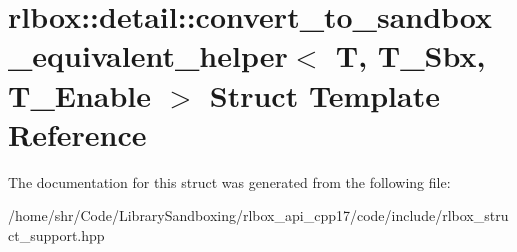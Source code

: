\hypertarget{structrlbox_1_1detail_1_1convert__to__sandbox__equivalent__helper}{}\section{rlbox\+:\+:detail\+:\+:convert\+\_\+to\+\_\+sandbox\+\_\+equivalent\+\_\+helper$<$ T, T\+\_\+\+Sbx, T\+\_\+\+Enable $>$ Struct Template Reference}
\label{structrlbox_1_1detail_1_1convert__to__sandbox__equivalent__helper}


The documentation for this struct was generated from the following file\+:\begin{DoxyCompactItemize}
\item 
/home/shr/\+Code/\+Library\+Sandboxing/rlbox\+\_\+api\+\_\+cpp17/code/include/rlbox\+\_\+struct\+\_\+support.\+hpp\end{DoxyCompactItemize}

